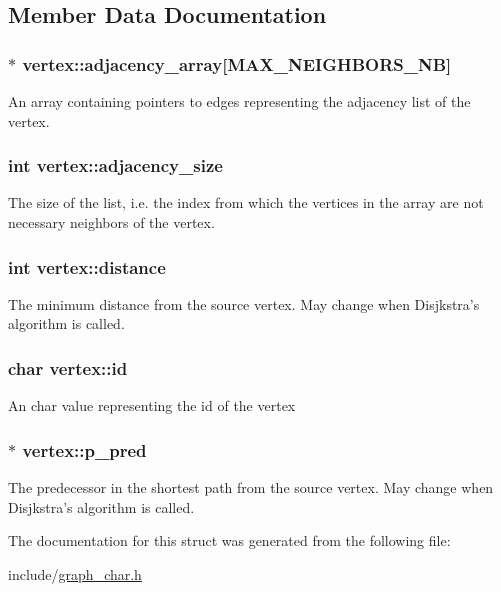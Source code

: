 \subsection{Member Data Documentation}
\hypertarget{structvertex_a3f94c351e442c70f9b503ac380ad460a}{
\subsubsection[{adjacency\-\_\-array}]{$\ast$ vertex\-::adjacency\-\_\-array\mbox{[}{\bf M\-A\-X\-\_\-\-N\-E\-I\-G\-H\-B\-O\-R\-S\-\_\-\-N\-B}\mbox{]}}}\label{structvertex_a3f94c351e442c70f9b503ac380ad460a}
An array containing pointers to edges representing the adjacency list of the vertex. \hypertarget{structvertex_abe014b5e3b93b82ba585a6578a3b9ed3}{
\subsubsection[{adjacency\-\_\-size}]{\setlength{\rightskip}{0pt plus 5cm}int vertex\-::adjacency\-\_\-size}}\label{structvertex_abe014b5e3b93b82ba585a6578a3b9ed3}
The size of the list, i.\-e. the index from which the vertices in the array are not necessary neighbors of the vertex. \hypertarget{structvertex_a60dab6ff86564acea3c8282a1488a4ef}{
\subsubsection[{distance}]{\setlength{\rightskip}{0pt plus 5cm}int vertex\-::distance}}\label{structvertex_a60dab6ff86564acea3c8282a1488a4ef}
The minimum distance from the source vertex. May change when Disjkstra's algorithm is called. \hypertarget{structvertex_a892669c60521d3e785b24f88d03f6537}{
\subsubsection[{id}]{\setlength{\rightskip}{0pt plus 5cm}char vertex\-::id}}\label{structvertex_a892669c60521d3e785b24f88d03f6537}
An {\ttfamily char} value representing the id of the vertex \hypertarget{structvertex_a505c7e912c4778ec948558d78cfdda6a}{
\subsubsection[{p\-\_\-pred}]{$\ast$ vertex\-::p\-\_\-pred}}\label{structvertex_a505c7e912c4778ec948558d78cfdda6a}
The predecessor in the shortest path from the source vertex. May change when Disjkstra's algorithm is called. 

The documentation for this struct was generated from the following file\-:\begin{DoxyCompactItemize}
\item 
include/\hyperlink{graph__char_8h}{graph\-\_\-char.\-h}\end{DoxyCompactItemize}
